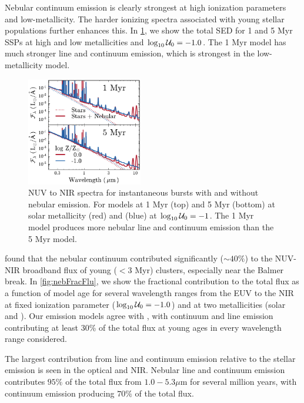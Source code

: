 Nebular continuum emission is clearly strongest at high ionization parameters and low-metallicity. The harder ionizing spectra associated with young stellar populations further enhances this. In \ref{fig:nebSpecDiff}, we show the total SED for 1 and 5 Myr SSPs at high and low metallicities and $\log_{10} \mathcal{U}_0 =-1.0$. The 1 Myr model has much stronger line and continuum emission, which is strongest in the low-metallicity model.

\begin{figure}[!htbp]
  \begin{centering}
    \includegraphics[width=0.45\textwidth]{manuscript/chapter2/f11.pdf}
    \caption{NUV to NIR spectra for instantaneous bursts with and without nebular emission. For models at 1 Myr (top) and 5 Myr (bottom) at solar metallicity (red) and  (blue) at $\log_{10} \mathcal{U}_0=-1$. The 1 Myr model produces more nebular line and continuum emission than the 5 Myr model.}
    \label{fig:nebSpecDiff}
  \end{centering}
\end{figure}

\citet{Reines10} found that the nebular continuum contributed significantly ($\sim40\%$) to the NUV-NIR broadband flux of young ($<3$ Myr) clusters, especially near the Balmer break. In \ref{fig:nebFracFlu}, we show the fractional contribution to the total flux as a function of model age for several wavelength ranges from the EUV to the NIR at fixed ionization parameter ($\log_{10} \mathcal{U}_0=-1.0$) and at two metallicities (solar and ). Our emission models agree with \citet{Reines10}, with continuum and line emission contributing at least 30\% of the total flux at young ages in every wavelength range considered.

The largest contribution from line and continuum emission relative to the stellar emission is seen in the optical and NIR. Nebular line and continuum emission contributes $95\%$ of the total flux from $1.0-5.3\mu$m for several million years, with continuum emission producing $70\%$ of the total flux.

